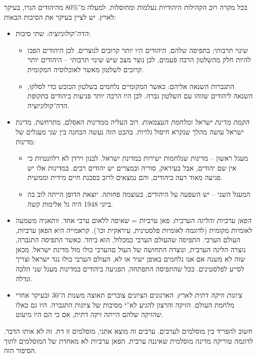 \documentclass[]{../../../../tex/classes/styledArticle}
\begin{document}
	בכל מקרה רוב הקהילות היהודיות נעלמות ומחוסלות. למעלה מ־80\% מהיהודים הגרו, בעיקר לארץ. יש לציין בעיקר את הסיבות הבאות: 
	\begin{itemize}
		\item \textit{הדה־קולוניזציה: }שתי סיבות: 
		\begin{itemize}
			\item שינוי תרבותי: בתפיסה שלהם, היהודים היו יותר קרובים לנוצרים. לכן היהודים הפכו להיות חלק מהשלטון הרבה פעמים. לכן נוצר מצב שיש שינוי תרבותי – היהודים יותר קרובים לשלטון מאשר לאוכלוסיה המקומית. 
			\item התגברות השנאה אליהם: כאשר המקומיים נלחמים בשלטון הכובש כדי לסלקו, השנאה ליהודים שזוהו עם השלטון גברה. לכן היו הרבה יותר פגיעות ביהודים בתקופת הדה־קולוניזציה. 
		\end{itemize}
		\item \textit{הקמת מדינת ישראל ומלחמת העצמאות: }רוב העליה ממדינות האסלם, מתרחשת. מדינת ישראל עושה מהלך שנקרא חיסול גלויות. בהבט הזה נעשה הבחנה בין שני מעגלים של מדינות: 
		\begin{itemize}
			\item מעגל ראשון – מדינות שנלחמות ישירות במדינת ישראל. לבנון וירדן לא רלוונטיות כי אין שם יהודים, אבל בעיראק, סוריה ובמצרים יש יהודים רבים. במדינות אלו יש פגיעה מאוד רעה ביהודים, והם נמצאים לרוב בסכנת חיים מידית וממשית. 
			\item המעגל השני – יש השפעה על היהודים, בעוצמה פחותה. יוצאת הדופן הייתה לוב בה ביוני 1948 היה גל אלימות קשה. 
		\end{itemize}
		\item \textit{הפאן ערביות והליגה הערבית: }פאן ערביות = שאיפה ללאום ערבי אחד. וותאניה משמעה לאומיות מקומית (לדוגמה לאומיות פלסטינית, עיראקית וכו'). קראמייה היא הפאן ערביות, העולם הערבי. התפיסה שהעולם הערבי כמכלול, הוא ביחד. כאשר התפיסה התגברה, נוצרה הליגה הערבית, ונוצרה התחושה של העול םהערבי כולו מול מדינת ישראל. מכאן שזה לא משנה אם אנו נלחמים באופן ישיר או לא, העולם הערבי כולו נגד ישראל וצריך לסייע לפלסטינים. ככל שהתפיסה התפתחה, הפגיעה ביהודים במדינות מעגל שני הלכה וגדלה. 
		\item \textit{ציונות וזיקה דתית לארץ: }הארגונים הציונים צוברים תאוצה משנות ה־30 ובעיקר אחרי מלחמת העולם. הזיקה והרצון להגיע לא''י מסיבות של ציונות התגברה. היו גם כאלו שהזיקה שלהם הייתה זיקה דתית, אם כי הם היו מיעוט. 
	\end{itemize}
	
	חשוב להפריד בין מוסלמים לערבים. ערבים זה מוצא אתני, מוסלמים זו דת. זה לא אותו הדבר. לדוגמה טוריקה מדינה מוסלמית שאיננה ערבית. הפאן ערביות לא מאחדת של המוסלמים לתוך הסיפור הזה. 
	
\end{document}

